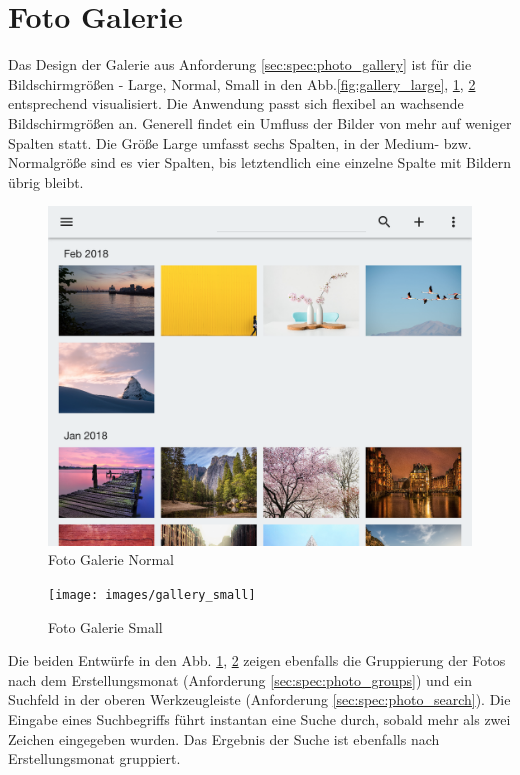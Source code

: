 \section{Foto Galerie}
\label{sec:ux:photo_gallery}

Das Design der Galerie aus Anforderung \ref{sec:spec:photo_gallery} ist für die Bildschirmgrößen - Large, Normal, Small in den Abb.\ref{fig:gallery_large}, \ref{fig:gallery_normal}, \ref{fig:gallery_small} entsprechend visualisiert. Die Anwendung passt sich flexibel an wachsende Bildschirmgrößen an. Generell findet ein Umfluss der Bilder von mehr auf weniger Spalten statt. Die Größe Large umfasst sechs Spalten, in der Medium- bzw. Normalgröße sind es vier Spalten, bis letztendlich eine einzelne Spalte mit Bildern übrig bleibt.

\begin{figure}[htp]     %
\centering
\includegraphics[width=1.0\textwidth]{images/gallery_normal}
\caption{Foto Galerie Normal}\label{fig:gallery_normal}
\end{figure}

\begin{figure}[htp]     %
\centering
\texttt{[image: images/gallery\_small]}
\caption{Foto Galerie Small}\label{fig:gallery_small}
\end{figure}

Die beiden Entwürfe in den Abb. \ref{fig:gallery_normal}, \ref{fig:gallery_small} zeigen ebenfalls die Gruppierung der Fotos nach dem Erstellungsmonat (Anforderung \ref{sec:spec:photo_groups}) und ein Suchfeld in der oberen Werkzeugleiste (Anforderung \ref{sec:spec:photo_search}). Die Eingabe eines Suchbegriffs führt instantan eine Suche durch, sobald mehr als zwei Zeichen eingegeben wurden. Das Ergebnis der Suche ist ebenfalls nach Erstellungsmonat gruppiert.


